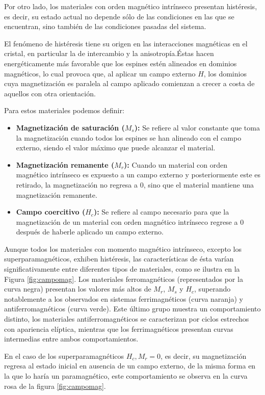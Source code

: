 \documentclass[../main.tex]{subfiles}
\begin{document}
Por otro lado, los materiales con orden magnético intrínseco presentan histéresis, es decir, su estado actual no depende sólo de las condiciones en las que se encuentran, sino también de las condiciones pasadas del sistema.

El fenómeno de histéresis tiene su origen en las interacciones magnéticas en el cristal, en particular la de intercambio y la anisotropía.Éstas hacen energéticamente más favorable que los espines estén alineados en dominios magnéticos, lo cual provoca que, al aplicar un campo externo $H$, los dominios cuya magnetización es paralela al campo aplicado comienzan a crecer a costa de aquellos con otra orientación.

Para estos materiales podemos definir:
\begin{itemize}
    \item \textbf{Magnetización de saturación ($M_s$):} Se refiere al valor constante que toma la magnetización cuando todos los espines se han alineado con el campo externo, siendo el valor máximo que puede alcanzar el material.
    \item \textbf{Magnetización remanente ($M_r$):} Cuando un material con orden magnético intrínseco es expuesto a un campo externo y posteriormente este es retirado, la magnetización no regresa a 0, sino que el material mantiene una magnetización remanente.
    \item \textbf{Campo coercitivo ($H_c$):} Se refiere al campo necesario para que la magnetización de un material con orden magnético intrínseco regrese a 0 después de haberle aplicado un campo externo.
\end{itemize}
Aunque todos los materiales con momento magnético intrínseco, excepto los superparamagnéticos, exhiben histéresis, las características de ésta varían significativamente entre diferentes tipos de materiales, como se ilustra en la Figura \ref{fig:campomag}. Los materiales ferromagnéticos (representados por la curva negra) presentan los valores más altos de $M_r$, $M_s$ y $H_c$, superando notablemente a los observados en sistemas ferrimagnéticos (curva naranja) y antiferromagnéticos (curva verde). Este último grupo muestra un comportamiento distinto, los materiales antiferromagnéticos se caracterizan por ciclos estrechos con apariencia elíptica, mientras que los ferrimagnéticos presentan curvas intermedias entre ambos comportamientos.

En el caso de los superparamagnéticos $H_c,M_r=0$, es decir, su magnetización regresa al estado inicial en ausencia de un campo externo, de la misma forma en la que lo haría un paramagnético, este comportamiento se observa en la curva rosa de la figura \ref{fig:campomag}.
\end{document}
